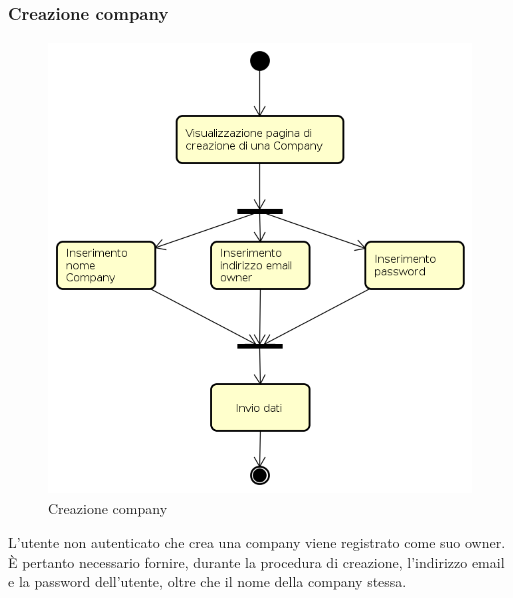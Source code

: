\subsubsection{Creazione company}
\begin{figure}[H]
\begin{center}
\includegraphics[height=12cm]{res/sections/backend/activities/creazioneCompany.png}
\caption{Creazione company}
\end{center}
\end{figure}
L'utente non autenticato che crea una company viene registrato come suo owner. È pertanto necessario fornire, durante la procedura di creazione, l'indirizzo email e la password dell'utente, oltre che il nome della company stessa.
